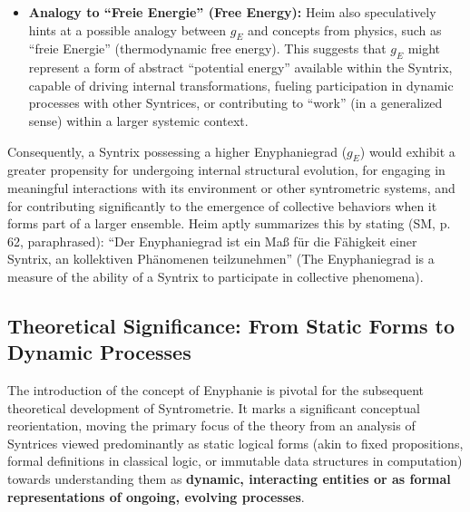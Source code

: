 \documentclass[
    12pt,              %
    a4paper,           %
    headings=normal,   %
    twoside=true,      %
    BCOR=8mm,          %
]{scrbook}
\newcommand{\q}[1]{\enquote{#1}}
\newcommand{\enyphaniegrad}{g_E}
\begin{document}
\begin{itemize}
    \item   \textbf{Analogy to \q{Freie Energie} (Free Energy):} Heim also speculatively hints at a possible analogy between \(\enyphaniegrad\) and concepts from physics, such as \q{freie Energie} (thermodynamic free energy). This suggests that \(\enyphaniegrad\) might represent a form of abstract \q{potential energy} available within the Syntrix, capable of driving internal transformations, fueling participation in dynamic processes with other Syntrices, or contributing to \q{work} (in a generalized sense) within a larger systemic context.
\end{itemize}
Consequently, a Syntrix possessing a higher Enyphaniegrad (\(\enyphaniegrad\)) would exhibit a greater propensity for undergoing internal structural evolution, for engaging in meaningful interactions with its environment or other syntrometric systems, and for contributing significantly to the emergence of collective behaviors when it forms part of a larger ensemble. Heim aptly summarizes this by stating (SM, p. 62, paraphrased): \q{Der Enyphaniegrad ist ein Maß für die Fähigkeit einer Syntrix, an kollektiven Phänomenen teilzunehmen} (The Enyphaniegrad is a measure of the ability of a Syntrix to participate in collective phenomena).

\subsection{Theoretical Significance: From Static Forms to Dynamic Processes}
\label{sec:ch4_shift_focus_dynamic_revised} 

The introduction of the concept of Enyphanie is pivotal for the subsequent theoretical development of Syntrometrie. It marks a significant conceptual reorientation, moving the primary focus of the theory from an analysis of Syntrices viewed predominantly as static logical forms (akin to fixed propositions, formal definitions in classical logic, or immutable data structures in computation) towards understanding them as \textbf{dynamic, interacting entities or as formal representations of ongoing, evolving processes}.
\end{document}
